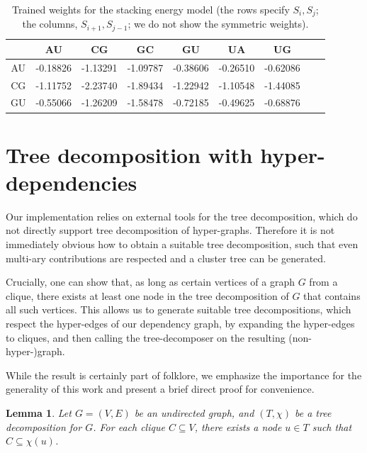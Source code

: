 \documentclass[10pt]{article}
\newtheorem{lemma}[theorem]{Lemma}
\begin{document}
\begin{table}[b]
  \centering
  \caption{Trained weights for the stacking energy model (the rows specify $S_i,S_j$; the columns, $S_{i+1},S_{j-1}$; we do not show the symmetric weights).}
  \label{tab:stackingmodel}
  \begin{tabular}{c@{\quad}|@{\quad}c@{\quad}c@{\quad}c@{\quad}c@{\quad}c@{\quad}c@{\quad}c@{\quad}c}
       & AU & CG & GC & GU & UA & UG \\\hline
    AU &
-0.18826 &
-1.13291 &
-1.09787 &
-0.38606 &
-0.26510 &
-0.62086
    \\
    CG &
-1.11752 &
-2.23740 &
-1.89434 &
-1.22942 &
-1.10548 &
-1.44085
    \\
    GU &
-0.55066 &
-1.26209 &
-1.58478 &
-0.72185 &
-0.49625 &
-0.68876
    \\
  \end{tabular}
\end{table}

\section{Tree decomposition with hyper-dependencies}
\label{appsec:dependency-cliques}

Our implementation relies on external tools for the tree decomposition, which do not directly support tree decomposition of hyper-graphs. Therefore it is not immediately obvious how 
to obtain a suitable tree decomposition, such that even multi-ary contributions are respected and a cluster tree can be generated.

Crucially, one can show that, as long as certain vertices of a graph $G$ from a clique, there exists at least one node in the tree decomposition of $G$ that contains all such vertices.
%
This allows us to generate suitable tree decompositions, which respect the hyper-edges of our dependency graph, by expanding the hyper-edges to cliques, and then calling the tree-decomposer on the resulting (non-hyper-)graph.

%
While the result is certainly part of folklore, we emphasize the importance for the generality of this work and present a brief direct proof for convenience.

\begin{lemma}\label{lem:cliques}
Let $G=(V,E)$ be an undirected graph, and  $(T,\chi)$ be a tree decomposition for $G$. For each clique $C\subseteq V$, there exists a node $u \in T$ such that $C\subseteq\chi(u)$.
\end{lemma}
\end{document}

